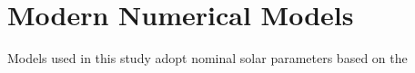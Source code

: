 \section{Modern Numerical Models}
Models used in this study adopt nominal solar parameters based on the 